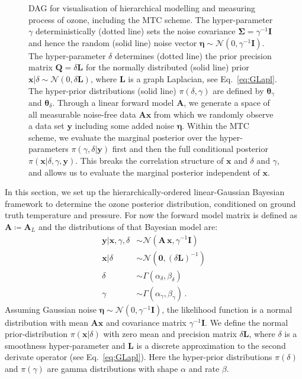 \begin{figure}[htb!]
\begin{tikzpicture}
	\end{tikzpicture} 
	\caption[Directed acyclic graph for ozone retrieval and MTC scheme.]{DAG for visualisation of hierarchical modelling and measuring process of ozone, including the MTC scheme. The hyper-parameter $\gamma$ deterministically (dotted line) sets the noise covariance $\bm{\Sigma} = \gamma^{-1}\bm{I}$ and hence the random (solid line) noise vector $\bm{\eta} \sim \mathcal{N}(0, \gamma^{-1}\bm{I})$.
		The hyper-parameter $\delta$ determines (dotted line) the prior precision matrix $\bm{Q} = \delta \bm{L}$ for the normally distributed (solid line) prior $\bm{x}| \delta \sim \mathcal{N}(0, \delta \bm{L})$, where $\bm{L}$ is a graph Laplacian, see Eq.~\ref{eq:GLapl}.
		The hyper-prior distributions (solid line) $\pi(\delta, \gamma)$ are defined by $\bm{\theta}_{\gamma}$ and $\bm{\theta}_{\delta}$.
		Through a linear forward model $\bm{A}$, we generate a space of all measurable noise-free data $\bm{A}\bm{x}$ from which we randomly observe a data set $\bm{y}$ including some added noise $\bm{\eta}$.
		Within the MTC scheme, we evaluate the marginal posterior over the hyper-parameters $\pi(\gamma, \delta | \bm{y})$ first and then the full conditional posterior $\pi(\bm{x}|\delta,\gamma,\bm{y})$. This breaks the correlation structure of $\bm{x}$ and $\delta$ and $\gamma$, and allows us to evaluate the marginal posterior independent of $\bm{x}$.}
	\label{fig:DAGO3}
\end{figure}
In this section, we set up the hierarchically-ordered linear-Gaussian Bayesian framework to determine the ozone posterior distribution, conditioned on ground truth temperature and pressure.
For now the forward model matrix is defined as $\bm{A} \coloneqq \bm{A}_L$ and the distributions of that Bayesian model are:
\begin{subequations}
		\label{eq:O3BayMode}
	\begin{align}
		\bm{y} |  \bm{x},\gamma,\delta  &\sim \mathcal{N}(\bm{A} \, \bm{x}, \gamma^{-1} \bm{I}) \label{eq:likelihoodAppl} \\
		\bm{x}| \delta  &\sim \mathcal{N}(\bm{0}, (\delta \bm{L})^{-1} ) \label{eq:priorXAppl} \\
		\delta  &\sim \Gamma(\alpha_{\delta}, \beta_{\delta})\label{eq:priorDelAppl} \\
		\gamma  &\sim \Gamma(\alpha_{\gamma}, \beta_{\gamma})\label{eq:priorGamAppl} \, .
	\end{align} 
\end{subequations}
Assuming Gaussian noise $\bm{\eta} \sim \mathcal{N}(0, \gamma^{-1} \bm{I})$, the likelihood function is a normal distribution with mean $\bm{A} \bm{x}$ and covariance matrix $\gamma^{-1} \bm{I}$.
We define the normal prior-distribution $\pi(\bm{x}|\delta)$ with zero mean and precision matrix $\delta \bm{L}$, where $\delta$ is a smoothness hyper-parameter and $\bm{L}$ is a discrete approximation to the second derivate operator (see Eq.~\ref{eq:GLapl}).
Here the hyper-prior distributions $\pi(\delta)$ and $\pi(\gamma)$ are gamma distributions with shape $\alpha$ and rate $\beta$.

